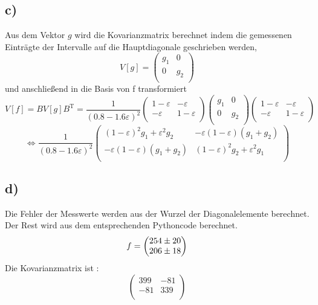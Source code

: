 \subsection*{c)}
Aus dem Vektor $g$ wird die Kovarianzmatrix berechnet indem die gemessenen Einträgte  der Intervalle auf die Hauptdiagonale geschrieben werden,
\begin{equation}
  V[g] =   
  \begin{pmatrix}
    g_1 & 0 \\
    0 & g_2 \\
  \end{pmatrix}
\end{equation}
und anschließend in die Basis von f transformiert 
\begin{equation}
  V[f] = B V[g] B^\text{T} = \frac{1}{(0.8 - 1.6 \varepsilon)^2}
  \begin{pmatrix}
    1 - \varepsilon & - \varepsilon \\
    - \varepsilon & 1 - \varepsilon \\
  \end{pmatrix}
  \begin{pmatrix}
    g_1 & 0 \\
    0 & g_2 \\
  \end{pmatrix}
  \begin{pmatrix}
    1 - \varepsilon & - \varepsilon \\
    - \varepsilon & 1 - \varepsilon \\
  \end{pmatrix}
\end{equation}
\begin{equation}
  \Leftrightarrow \frac{1}{(0.8 - 1.6 \varepsilon)^2}
  \begin{pmatrix}
    (1 - \varepsilon)^2 g_1 + \varepsilon^2 g_2 & -\varepsilon(1-\varepsilon)(g_1 +g_2) \\
    -\varepsilon(1-\varepsilon)(g_1 +g_2) & (1 - \varepsilon)^2 g_2 + \varepsilon^2 g_1  \\
  \end{pmatrix}
\end{equation}
\subsection*{d)}
Die Fehler der Messwerte werden aus der Wurzel der Diagonalelemente berechnet. Der Rest wird aus dem entsprechenden Pythoncode berechnet.
\begin{equation}
  f = \begin{pmatrix}
    \num{254 +- 20}\\
    \num{206 +- 18}\\
    \end{pmatrix}
\end{equation}
Die Kovarianzmatrix ist :
\begin{equation}
  \begin{pmatrix}
    399 & -81 \\
    -81 & 339 \\
  \end{pmatrix}
\end{equation}

